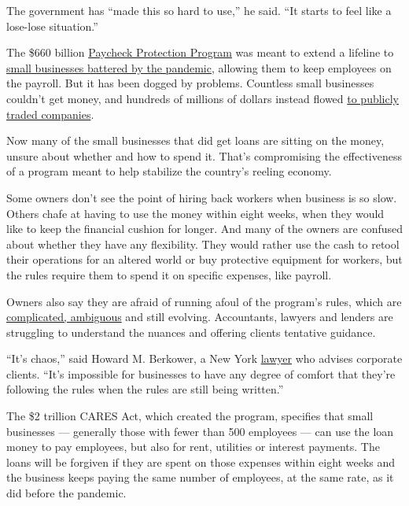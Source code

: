 The government has ``made this so hard to use,'' he said. ``It starts to
feel like a lose-lose situation.''

The \$660 billion
\href{https://www.nytimes.com/2020/06/30/us/politics/ppp-extension.html}{Paycheck
Protection Program} was meant to extend a lifeline to
\href{https://www.nytimes.com/2020/07/13/business/small-businesses-coronavirus.html}{small
businesses battered by the pandemic}, allowing them to keep employees on
the payroll. But it has been dogged by problems. Countless small
businesses couldn't get money, and hundreds of millions of dollars
instead flowed
\href{https://www.nytimes.com/2020/04/26/business/coronavirus-small-business-loans-large-companies.html}{to
publicly traded companies}.

Now many of the small businesses that did get loans are sitting on the
money, unsure about whether and how to spend it. That's compromising the
effectiveness of a program meant to help stabilize the country's reeling
economy.

Some owners don't see the point of hiring back workers when business is
so slow. Others chafe at having to use the money within eight weeks,
when they would like to keep the financial cushion for longer. And many
of the owners are confused about whether they have any flexibility. They
would rather use the cash to retool their operations for an altered
world or buy protective equipment for workers, but the rules require
them to spend it on specific expenses, like payroll.

Owners also say they are afraid of running afoul of the program's rules,
which are
\href{https://www.rklcpa.com/ppp-loan-forgiveness-known-unknown-action-items/}{complicated,
ambiguous} and still evolving. Accountants, lawyers and lenders are
struggling to understand the nuances and offering clients tentative
guidance.

``It's chaos,'' said Howard M. Berkower, a New York
\href{https://www.mccarter.com/people/howard-m-berkower/}{lawyer} who
advises corporate clients. ``It's impossible for businesses to have any
degree of comfort that they're following the rules when the rules are
still being written.''

The \$2 trillion CARES Act, which created the program, specifies that
small businesses --- generally those with fewer than 500 employees ---
can use the loan money to pay employees, but also for rent, utilities or
interest payments. The loans will be forgiven if they are spent on those
expenses within eight weeks and the business keeps paying the same
number of employees, at the same rate, as it did before the pandemic.

